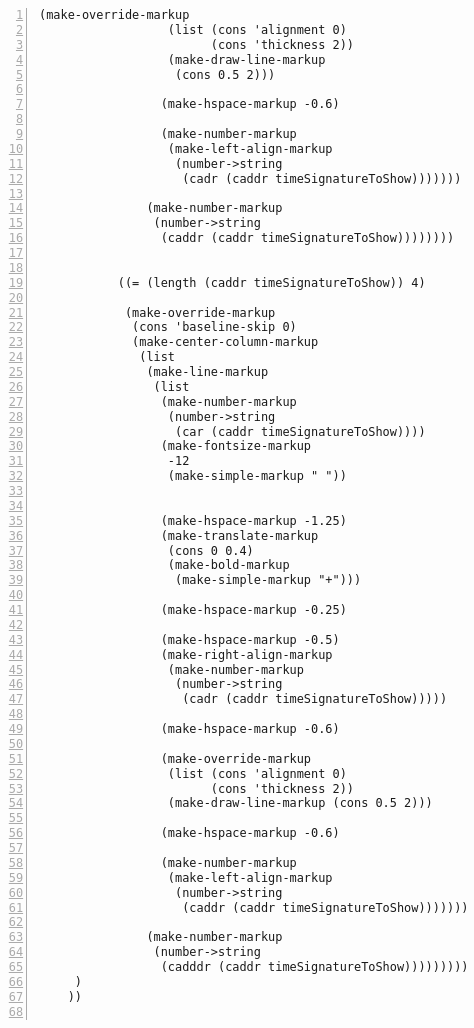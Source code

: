 \begin{Verbatim}[numbers=left,xleftmargin=5mm]
                 (make-override-markup
                  (list (cons 'alignment 0)
                        (cons 'thickness 2))
                  (make-draw-line-markup
                   (cons 0.5 2)))

                 (make-hspace-markup -0.6)

                 (make-number-markup
                  (make-left-align-markup
                   (number->string
                    (cadr (caddr timeSignatureToShow)))))))

               (make-number-markup
                (number->string
                 (caddr (caddr timeSignatureToShow))))))))


           ((= (length (caddr timeSignatureToShow)) 4)

            (make-override-markup
             (cons 'baseline-skip 0)
             (make-center-column-markup
              (list
               (make-line-markup
                (list
                 (make-number-markup
                  (number->string
                   (car (caddr timeSignatureToShow))))
                 (make-fontsize-markup
                  -12
                  (make-simple-markup " "))


                 (make-hspace-markup -1.25)
                 (make-translate-markup
                  (cons 0 0.4)
                  (make-bold-markup
                   (make-simple-markup "+")))

                 (make-hspace-markup -0.25)

                 (make-hspace-markup -0.5)
                 (make-right-align-markup
                  (make-number-markup
                   (number->string
                    (cadr (caddr timeSignatureToShow)))))

                 (make-hspace-markup -0.6)

                 (make-override-markup
                  (list (cons 'alignment 0)
                        (cons 'thickness 2))
                  (make-draw-line-markup (cons 0.5 2)))

                 (make-hspace-markup -0.6)

                 (make-number-markup
                  (make-left-align-markup
                   (number->string
                    (caddr (caddr timeSignatureToShow)))))))

               (make-number-markup
                (number->string
                 (cadddr (caddr timeSignatureToShow)))))))))
     )
    ))


\end{Verbatim}
